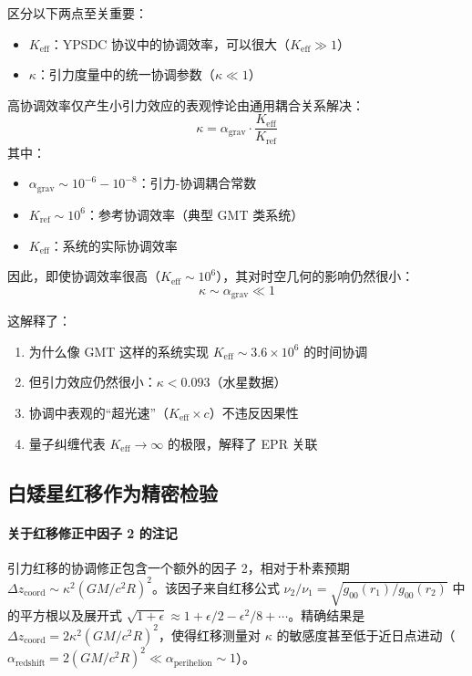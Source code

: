 \documentclass[11pt,a4paper]{article}
\begin{document}
	区分以下两点至关重要：
	\begin{itemize}
		\item \textbf{$K_{\mathrm{eff}}$}：YPSDC 协议中的协调效率，可以很大（$K_{\mathrm{eff}} \gg 1$）
		\item \textbf{$\kappa$}：引力度量中的统一协调参数（$\kappa \ll 1$）
	\end{itemize}
	
	高协调效率仅产生小引力效应的表观悖论由通用耦合关系解决：
	\begin{equation}
		\boxed{\kappa = \alpha_{\text{grav}} \cdot \frac{K_{\mathrm{eff}}}{K_{\text{ref}}}}
	\end{equation}
	其中：
	\begin{itemize}
		\item $\alpha_{\text{grav}} \sim 10^{-6} - 10^{-8}$：引力-协调耦合常数
		\item $K_{\text{ref}} \sim 10^6$：参考协调效率（典型 GMT 类系统）
		\item $K_{\mathrm{eff}}$：系统的实际协调效率
	\end{itemize}
	
	因此，即使协调效率很高（$K_{\mathrm{eff}} \sim 10^6$），其对时空几何的影响仍然很小：
	\[
	\kappa \sim \alpha_{\text{grav}} \ll 1
	\]
	
	这解释了：
	\begin{enumerate}
		\item 为什么像 GMT 这样的系统实现 $K_{\mathrm{eff}} \sim 3.6\times10^6$ 的时间协调
		\item 但引力效应仍然很小：$\kappa < 0.093$（水星数据）
		\item 协调中表观的“超光速”（$K_{\mathrm{eff}} \times c$）不违反因果性
		\item 量子纠缠代表 $K_{\mathrm{eff}} \to \infty$ 的极限，解释了 EPR 关联
	\end{enumerate}
	
	\subsection{白矮星红移作为精密检验}
	\paragraph{关于红移修正中因子 2 的注记}
	引力红移的协调修正包含一个额外的因子 2，相对于朴素预期 $\Delta z_{\text{coord}} \sim \kappa^2 (GM/c^2R)^2$。该因子来自红移公式 $\nu_2/\nu_1 = \sqrt{g_{00}(r_1)/g_{00}(r_2)}$ 中的平方根以及展开式 $\sqrt{1 + \epsilon} \approx 1 + \epsilon/2 - \epsilon^2/8 + \cdots$。精确结果是 $\Delta z_{\text{coord}} = 2\kappa^2 (GM/c^2R)^2$，使得红移测量对 $\kappa$ 的敏感度甚至低于近日点进动（$\alpha_{\text{redshift}} = 2(GM/c^2R)^2 \ll \alpha_{\text{perihelion}} \sim 1$）。
	
\end{document}
